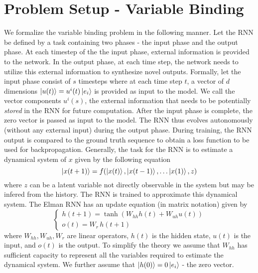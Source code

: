 \documentclass[11pt]{article}
\theoremstyle{definition}
\begin{document}
\section{Problem Setup - Variable Binding}

We formalize the variable binding problem in the following manner. Let the RNN be defined by a task containing two phases - the input phase and the output phase. At each timestep of the the input phase, external information is provided to the network. In the output phase, at each time step, the network needs to utilize this external information to synthesize novel outputs.
%
Formally, let the input phase consist of $s$ timesteps where at each time step $t$, a vector of $d$ dimensions $\ket{u(t)} = u^i(t) \ket{e_i}$ is provided as input to the model. We call the vector components $u^i(s)$, the external information that needs to be potentially \textit{stored} in the RNN for future computation.
%
After the input phase is complete, the zero vector is passed as input to the model. The RNN thus evolves autonomously (without any external input) during the output phase.
%
During training, the RNN output is compared to the ground truth sequence to obtain a loss function to be used for backpropagation. Generally, the task for the RNN is to estimate a dynamical system of $x$ given by the following equation
%
\begin{dmath}
    \ket{x(t+1)} = f(\ket{x(t)}, \ket{x(t-1)},\hdots \ket{x(1)}, z)
\end{dmath}
%
where $z$ can be a latent variable not directly observable in the system but may be infered from the history. The RNN is trained to approximate this dynamical system. The Elman RNN has an update equation (in matrix notation) given by
%
\begin{dmath}
    \begin{cases}
        h(t+1) = \tanh(W_{hh} h(t) + W_{u h} u(t)) \\
        o(t) = W_r \, h(t+1)
    \end{cases}
\end{dmath}
%
where $W_{hh}, W_{uh}, W_r$ are linear operators, $h(t)$ is the hidden state, $u(t)$ is the input, and $o(t)$ is the output. To simplify the theory we assume that $W_{hh}$ has sufficient capacity to represent all the variables required to estimate the dynamical system. We further assume that $\ket{h(0)} = 0 \ket{e_i}$ - the zero vector.
\end{document}
